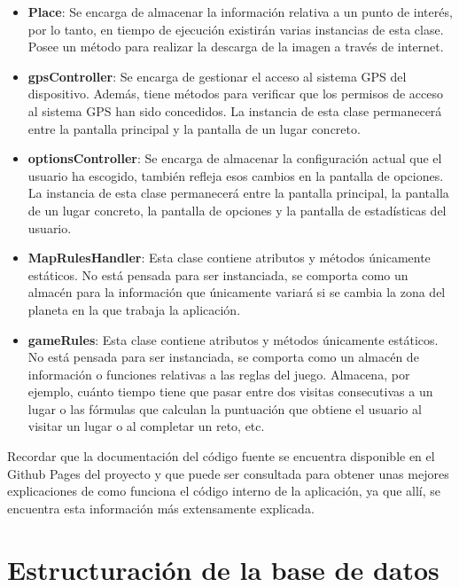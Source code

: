 \begin{itemize}
\item \textbf{Place}: Se encarga de almacenar la información relativa a un punto de interés, por lo tanto, en tiempo de ejecución existirán varias instancias de esta clase. Posee un método para realizar la descarga de la imagen a través de internet.

\item \textbf{gpsController}: Se encarga de gestionar el acceso al sistema GPS del dispositivo. Además, tiene métodos para verificar que los permisos de acceso al sistema GPS han sido concedidos. La instancia de esta clase permanecerá entre la pantalla principal y la pantalla de un lugar concreto.

\item \textbf{optionsController}: Se encarga de almacenar la configuración actual que el usuario ha escogido, también refleja esos cambios en la pantalla de opciones. La instancia de esta clase permanecerá entre la pantalla principal, la pantalla de un lugar concreto, la pantalla de opciones y la pantalla de estadísticas del usuario.

\item \textbf{MapRulesHandler}: Esta clase contiene atributos y métodos únicamente estáticos. No está pensada para ser instanciada, se comporta como un almacén para la información que únicamente variará si se cambia la zona del planeta en la que trabaja la aplicación.

\item \textbf{gameRules}: Esta clase contiene atributos y métodos únicamente estáticos. No está pensada para ser instanciada, se comporta como un almacén de información o funciones relativas a las reglas del juego. Almacena, por ejemplo, cuánto tiempo tiene que pasar entre dos visitas consecutivas a un lugar o las fórmulas que calculan la puntuación que obtiene el usuario al visitar un lugar o al completar un reto, etc.
\end{itemize}

Recordar que la documentación del código fuente se encuentra disponible en el Github Pages del proyecto\cite{doxygenDiscoverTenerife} y que puede ser consultada para obtener unas mejores explicaciones de como funciona el código interno de la aplicación, ya que allí, se encuentra esta información más extensamente explicada.


\section{Estructuración de la base de datos}

